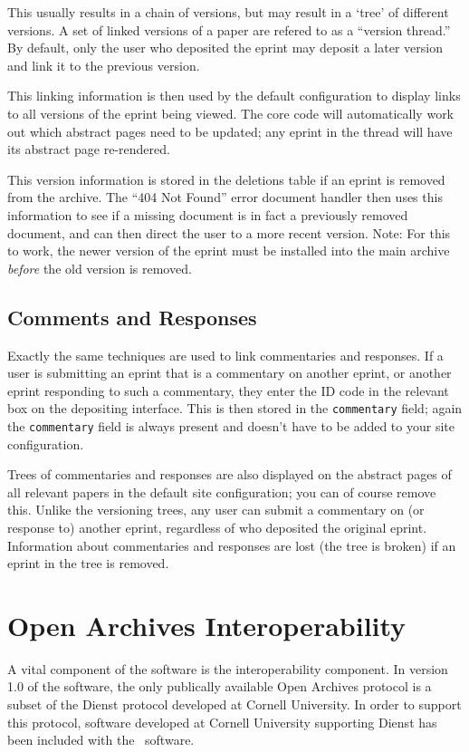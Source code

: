 This usually results in a chain of versions, but may result in a `tree' of different versions. A set of linked versions of a paper are refered to as a ``version thread.'' By default, only the user who deposited the eprint may deposit a later version and link it to the previous version.

This linking information is then used by the default configuration to display links to all versions of the eprint being viewed. The core code will automatically work out which abstract pages need to be updated; any eprint in the thread will have its abstract page re-rendered.

This version information is stored in the deletions table if an eprint is removed from the archive. The ``404 Not Found'' error document handler then uses this information to see if a missing document is in fact a previously removed document, and can then direct the user to a more recent version. Note: For this to work, the newer version of the eprint must be installed into the main archive \emph{before} the old version is removed.


\subsection{Comments and Responses}

Exactly the same techniques are used to link commentaries and responses. If a user is submitting an eprint that is a commentary on another eprint, or another eprint responding to such a commentary, they enter the ID code in the relevant box on the depositing interface. This is then stored in the {\tt commentary} field; again the {\tt commentary} field is always present and doesn't have to be added to your site configuration.

Trees of commentaries and responses are also displayed on the abstract pages of all relevant papers in the default site configuration; you can of course remove this. Unlike the versioning trees, any user can submit a commentary on (or response to) another eprint, regardless of who deposited the original eprint. Information about commentaries and responses are lost (the tree is broken) if an eprint in the tree is removed.


\section{Open Archives Interoperability}

A vital component of the software is the interoperability component. In version 1.0 of the software, the only publically available Open Archives protocol is a subset of the Dienst protocol developed at Cornell University. In order to support this protocol, software developed at Cornell University supporting Dienst has been included with the \eprints\ software.

